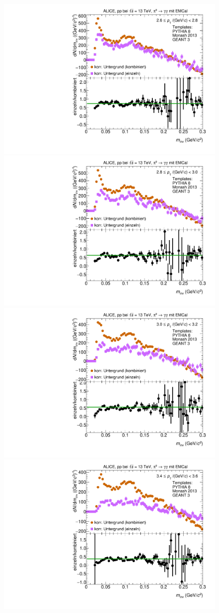 \begin{figure}[t]
\begin{multicols}{2}
\end{multicols}
\begin{multicols}{2}
    \includegraphics[width=.65\linewidth]{Anhang/BackgroundWithRatio07_Data_2016.pdf}\par
    \includegraphics[width=.65\linewidth]{Anhang/BackgroundWithRatio08_Data_2016.pdf}\par
\end{multicols}
\begin{multicols}{2}
    \includegraphics[width=.65\linewidth]{Anhang/BackgroundWithRatio09_Data_2016.pdf}\par
    \includegraphics[width=.65\linewidth]{Anhang/BackgroundWithRatio11_Data_2016.pdf}\par
\end{multicols}
\end{figure}
\clearpage

